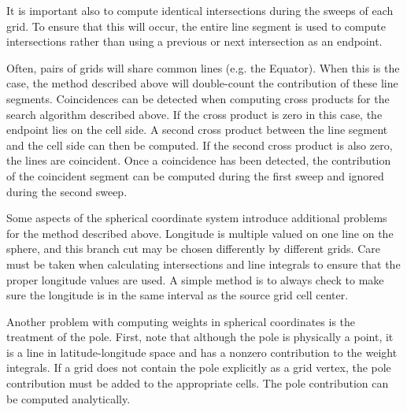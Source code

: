      It is important also to compute identical intersections during the sweeps
     of each grid.  To ensure that this will occur, the entire line segment is
     used to compute intersections rather than using a previous or next
     intersection as an endpoint.


     Often, pairs of grids will share common lines (e.g. the Equator).  When
     this is the case, the method described above will double-count the
     contribution of these line segments.  Coincidences can be detected when
     computing cross products for the search algorithm described above.  If
     the cross product is zero in this case, the endpoint lies on the cell
     side.  A second cross product between the line segment and the cell side
     can then be computed.  If the second cross product is also zero, the
     lines are coincident.  Once a coincidence has been detected, the
     contribution of the coincident segment can be computed during the
     first sweep and ignored during the second sweep.


     Some aspects of the spherical coordinate system introduce additional
     problems for the method described above.  Longitude is multiple valued
     on one line on the sphere, and this branch cut may be chosen differently
     by different grids.  Care must be taken when calculating intersections 
     and line integrals to ensure that the proper longitude values are used.
     A simple method is to always check to make sure the longitude is in the
     same interval as the source grid cell center.

     Another problem with computing weights in spherical coordinates is the
     treatment of the pole.  First, note that although the pole is physically
     a point, it is a line in latitude-longitude space and has a nonzero
     contribution to the weight integrals.  If a grid does not contain the
     pole explicitly as a grid vertex, the pole contribution must be added
     to the appropriate cells.  The pole contribution can be computed analytically.


